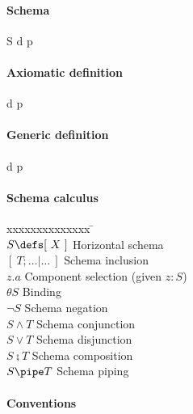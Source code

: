 \documentclass{article}
\begin{document}
\paragraph{Schema}

\begin{schema}{S}
	d
\where
	p
\end{schema}

\newpage


\paragraph{Axiomatic definition}

\begin{axdef}
	d
\where
	p
\end{axdef}

\paragraph{Generic definition}

\begin{gendef}[a, \dots]
	d
\where
	p
\end{gendef}

\paragraph{Schema calculus}

\begin{tabbing}
xxxxxxxxxxxxxx \= \kill \\ 
$S \defs [~ X ~]$ \> Horizontal schema \\
$[~ T; \dots | \dots ~]$  \> Schema inclusion \\
$z.a$ \> Component selection (given $z:S$) \\
$\theta S$ \> Binding \\
$\lnot S$ \> Schema negation \\
$S \land T$ \> Schema conjunction \\
$S \lor T$ \> Schema disjunction \\
$S \semi T$ \> Schema composition \\
$S \pipe T$ \> Schema piping \\
\end{tabbing}

\paragraph{Conventions}
\end{document}
